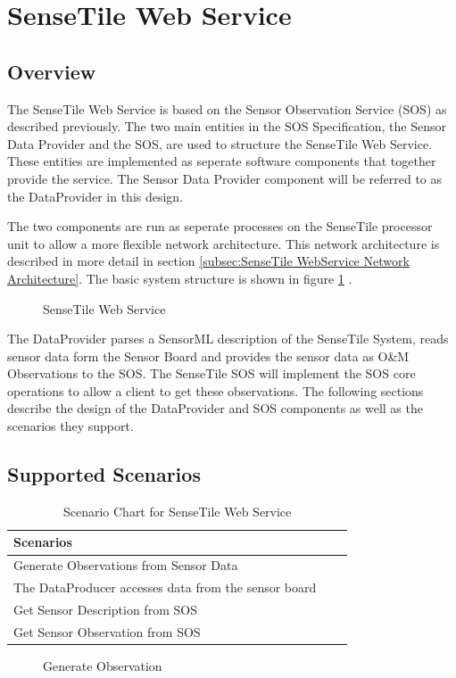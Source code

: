 \documentclass[]{final_report}
\begin{document}
\section{SenseTile Web Service}
\subsection{Overview}

The SenseTile Web Service is based on the Sensor Observation Service (SOS) as described previously. The two main entities in the SOS Specification, the Sensor Data Provider and the SOS,  are used to structure the SenseTile Web Service. These entities are implemented as seperate software components that together provide the service. The Sensor Data Provider component will be referred to as the DataProvider in this design.

The two components are run as seperate processes on the SenseTile processor unit to allow a more flexible network architecture.  This network architecture is described in more detail in section \ref{subsec:SenseTile WebService Network Architecture}. The basic system structure is shown in figure \ref {fig:Deployment_sensetile} .

\begin{figure}[h]
\centering
{}
\caption{SenseTile Web Service}\label{fig:Deployment_sensetile}
\end{figure}

The DataProvider parses a SensorML description of the SenseTile System, reads sensor data form the Sensor Board and provides the sensor data as O\&M Observations to the SOS. The SenseTile SOS will implement the SOS core operations to allow a client to get these observations. The following sections describe the design of the DataProvider and SOS components as well as the scenarios they support.

\subsection{Supported Scenarios}
\begin{table}[!th]
\begin{tabular}{|l|c|r|}
\hline
Scenarios\\
\hline
Generate Observations from Sensor Data \\
The DataProducer accesses data from the sensor board \\
\hline
Get Sensor Description from SOS\\
\hline
Get  Sensor Observation from SOS\\
\hline
\end{tabular}
\caption{Scenario Chart for SenseTile Web Service}
\label{ex:table}
\end{table}
\begin{figure}[h]
\centering
{}
\caption{Generate Observation}\label{fig:InsertObs}
\end{figure}
\end{document}
